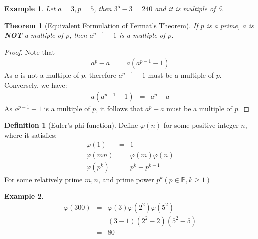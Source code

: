 \documentclass{article}
\theoremstyle{MyNonumberplain}
\theoremstyle{break}
\newtheorem*{proof}{Proof. }
\theoremstyle{break}
\newtheorem{theorem}{Theorem}[section]
\newtheorem{example}{Example}[section]
\theoremstyle{break}
\theoremstyle{definition}
\theoremstyle{break}
\newtheorem{definition}{Definition}[section]
\begin{document}
\begin{expbox}
    \begin{example}
        Let $a = 3, p = 5$, then $3^5 - 3 = 240$ and it is multiple of 5.
    \end{example}
\end{expbox}

\begin{thmbox}
    \begin{theorem}[Equivalent Formulation of Fermat's Theorem]
        If $p$ is a prime, $a$ is \textbf{NOT} a multiple of $p$, then $a^{p - 1} -
        1$ is a multiple of $p$.
    \end{theorem}
    \begin{prfbox}
        \begin{proof}
            Note that
            \begin{eqnarray*}
              a^p - a & = & a (a^{p - 1} - 1)
            \end{eqnarray*}
            As $a$ is not a multiple of $p$, therefore $a^{p - 1} - 1$ must be a multiple
            of $p$.\\
            
            Conversely, we have:
            \begin{eqnarray*}
              a (a^{p - 1} - 1) & = & a^p - a
            \end{eqnarray*}
            As $a^{p - 1} - 1$ is a multiple of $p$, it follows that $a^p - a$ must be a
            multiple of $p$.
        \end{proof}
    \end{prfbox}
\end{thmbox}

\begin{defbox}
    \begin{definition}[Euler's phi function]
        Define $\varphi (n)$ for some positive integer $n$, where it satisfies:
        \begin{eqnarray*}
          \varphi (1) & = & 1\\
          \varphi (m n) & = & \varphi (m) \varphi (n)\\
          \varphi (p^k) & = & p^k - p^{k - 1}
        \end{eqnarray*}
        For some relatively prime $m, n$, and prime power $p^k  (p \in \mathbb{P}, k
        \geq 1)$
    \end{definition}
\end{defbox}

\begin{expbox}
    \begin{example}
        \begin{eqnarray*}
            \varphi (300) & = & \varphi (3) \varphi (2^2) \varphi (5^2)\\
                          & = & (3 - 1) (2^2 - 2) (5^2 - 5)\\
                          & = & 80
          \end{eqnarray*}
    \end{example}
\end{expbox}
\end{document}

